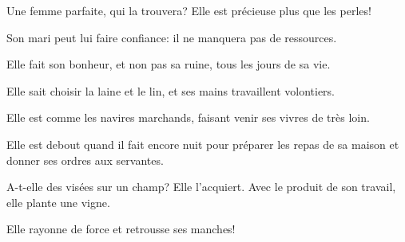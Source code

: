Une femme parfaite, qui la trouvera? Elle est précieuse plus que les perles!

Son mari peut lui faire confiance: il ne manquera pas de ressources.

Elle fait son bonheur, et non pas sa ruine, tous les jours de sa vie.

Elle sait choisir la laine et le lin, et ses mains travaillent volontiers.

Elle est comme les navires marchands, faisant venir ses vivres de très loin.

Elle est debout quand il fait encore nuit pour préparer les repas de sa maison et donner ses ordres aux servantes.

A-t-elle des visées sur un champ? Elle l’acquiert. Avec le produit de son travail, elle plante une vigne.

Elle rayonne de force et retrousse ses manches!
